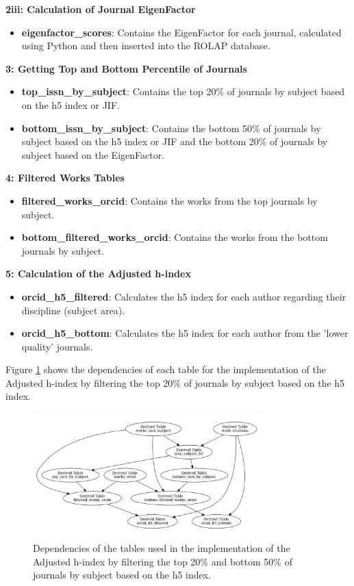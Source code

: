 \noindent\textbf{2iii: Calculation of Journal EigenFactor}
\begin{itemize}
      \item \textbf{eigenfactor\_scores}: Contains the EigenFactor for each journal, calculated using Python and then inserted into the ROLAP database.
\end{itemize}

\noindent\textbf{3: Getting Top and Bottom Percentile of Journals}
\begin{itemize}
      \item \textbf{top\_issn\_by\_subject}: Contains the top 20\% of journals by subject based on the h5 index or JIF.
      \item \textbf{bottom\_issn\_by\_subject}: Contains the bottom 50\% of journals by subject based on the h5 index or JIF and the bottom 20\% of journals by subject based on the EigenFactor.
\end{itemize}

\noindent\textbf{4: Filtered Works Tables}
\begin{itemize}
      \item \textbf{filtered\_works\_orcid}: Contains the works from the top journals by subject.
      \item \textbf{bottom\_filtered\_works\_orcid}: Contains the works from the bottom journals by subject.
\end{itemize}

\noindent\textbf{5: Calculation of the Adjusted h-index}
\begin{itemize}
      \item \textbf{orcid\_h5\_filtered}: Calculates the h5 index for each author regarding their discipline (subject area).
      \item \textbf{orcid\_h5\_bottom}: Calculates the h5 index for each author from the 'lower quality' journals.
\end{itemize}

Figure \ref{fig:tables} shows the dependencies of each table for the
implementation of the Adjusted h-index by filtering the top 20\% of journals by
subject based on the h5 index.

\begin{figure}[H]
      \centering
      \includegraphics[width=0.8\textwidth]{../figs/h5.pdf}
      \caption{Dependencies of the tables used in the implementation of the Adjusted h-index by filtering the top 20\% and bottom 50\% of journals by subject based on the h5 index.}
      \label{fig:tables}
\end{figure}

